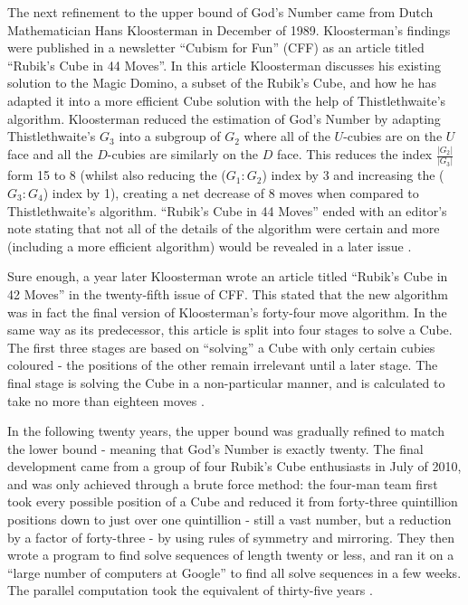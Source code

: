 \documentclass{report}
\begin{document}
    The next refinement to the upper bound of God’s Number came from Dutch Mathematician Hans Kloosterman in December of 1989. Kloosterman’s findings were published in a newsletter \enquote{Cubism for Fun} (CFF) as an article titled \enquote{Rubik’s Cube in 44 Moves}. In this article Kloosterman discusses his existing solution to the Magic Domino, a subset of the Rubik’s Cube, and how he has adapted it into a more efficient Cube solution with the help of Thistlethwaite’s algorithm. Kloosterman reduced the estimation of God’s Number by adapting Thistlethwaite’s $G_3$ into a subgroup of $G_2$ where all of the $U$-cubies are on the $U$ face and all the $D$-cubies are similarly on the $D$ face. This reduces the index $\frac{|G_2|}{|G_3|}$ form 15 to 8 (whilst also reducing the ($G_1:G_2$) index by 3 and increasing the ($G_3:G_4$) index by 1), creating a net decrease of 8 moves when compared to Thistlethwaite’s algorithm. \enquote{Rubik's Cube in 44 Moves} ended with an editor’s note stating that not all of the details of the algorithm were certain and more (including a more efficient algorithm) would be revealed in a later issue \cite{Kloosterman1989}.
    
    Sure enough, a year later Kloosterman wrote an article titled \enquote{Rubik’s Cube in 42 Moves} in the twenty-fifth issue of CFF. This stated that the new algorithm was in fact the final version of Kloosterman’s forty-four move algorithm. In the same way as its predecessor, this article is split into four stages to solve a Cube. The first three stages are based on \enquote{solving} a Cube with only certain cubies coloured - the positions of the other remain irrelevant until a later stage. The final stage is solving the Cube in a non-particular manner, and is calculated to take no more than eighteen moves \cite{Kloosterman1990}.
    
    In the following twenty years, the upper bound was gradually refined to match the lower bound - meaning that God’s Number is exactly twenty. The final development came from a group of four Rubik’s Cube enthusiasts in July of 2010, and was only achieved through a brute force method: the four-man team first took every possible position of a Cube and reduced it from forty-three quintillion positions down to just over one quintillion - still a vast number, but a reduction by a factor of forty-three - by using rules of symmetry and mirroring. They then wrote a program to find solve sequences of length twenty or less, and ran it on a \enquote{large number of computers at Google} to find all solve sequences in a few weeks. The parallel computation took the equivalent of thirty-five years \cite{Rokicki2010}.
    
\end{document}
